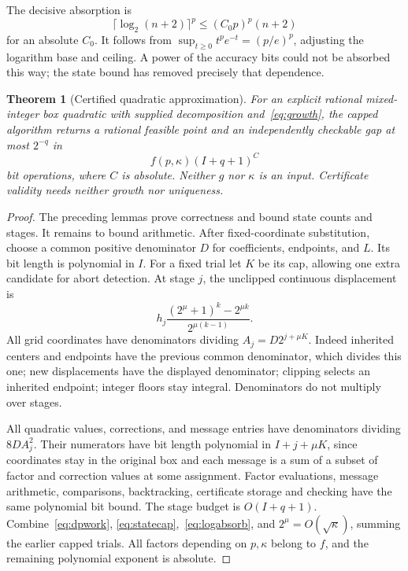 \documentclass[11pt]{article}
\newtheorem{theorem}{Theorem}[section]
\theoremstyle{remark}
\begin{document}
The decisive absorption is
\begin{equation}\label{eq:logabsorb}
\lceil\log_2(n+2)\rceil^p\le(C_0p)^p(n+2)
\end{equation}
for an absolute $C_0$. It follows from
$\sup_{t\ge0}t^pe^{-t}=(p/e)^p$, adjusting the logarithm base and
ceiling. A power of the accuracy bits could not be absorbed this way;
the state bound has removed precisely that dependence.

\begin{theorem}[Certified quadratic approximation]\label{thm:approx}
For an explicit rational mixed-integer box quadratic with supplied
decomposition and~\eqref{eq:growth}, the capped algorithm returns a
rational feasible point and an independently checkable gap at most
$2^{-q}$ in
\begin{equation}\label{eq:fpt}
f(p,\kappa)(I+q+1)^C
\end{equation}
bit operations, where $C$ is absolute. Neither $g$ nor $\kappa$ is an
input. Certificate validity needs neither growth nor uniqueness.
\end{theorem}
\begin{proof}
The preceding lemmas prove correctness and bound state counts and stages.
It remains to bound arithmetic. After fixed-coordinate substitution,
choose a common positive denominator $D$ for coefficients, endpoints,
and $L$. Its bit length is polynomial in $I$.
For a fixed trial let $K$ be its cap, allowing one extra candidate for
abort detection. At stage $j$, the unclipped continuous displacement is
\[
h_j\frac{(2^\mu+1)^k-2^{\mu k}}{2^{\mu(k-1)}}.
\]
All grid coordinates have denominators dividing
$A_j=D2^{j+\mu K}$. Indeed inherited centers and endpoints have the
previous common denominator, which divides this one; new displacements
have the displayed denominator; clipping selects an inherited endpoint;
integer floors stay integral. Denominators do not multiply over stages.

All quadratic values, corrections, and message entries have denominators
dividing $8DA_j^2$. Their numerators have bit length polynomial in
$I+j+\mu K$, since coordinates stay in the original box and each message
is a sum of a subset of factor and correction values at some assignment.
Factor evaluations, message arithmetic, comparisons, backtracking,
certificate storage and checking have the same polynomial bit bound.
The stage budget is $O(I+q+1)$. Combine~\eqref{eq:dpwork},
\eqref{eq:statecap},~\eqref{eq:logabsorb}, and
$2^\mu=O(\sqrt\kappa)$, summing the earlier capped trials. All factors
depending on $p,\kappa$ belong to $f$, and the remaining polynomial
exponent is absolute.
\end{proof}
\end{document}
